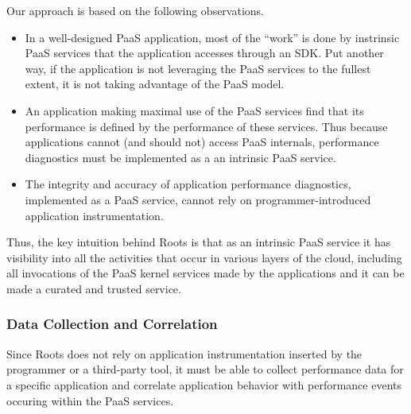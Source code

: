 Our approach is based on the following observations.
\begin{itemize}
\item In a well-designed PaaS application, most of the ``work'' is done by
instrinsic PaaS services that the application accesses through an SDK.  Put
another way, if the application is not leveraging the PaaS services to the
fullest extent, it is not taking advantage of the PaaS model.
\item An application making maximal use of the PaaS services find that its
performance is defined by the performance of these services.  Thus
because applications cannot (and should not) access PaaS 
internals, performance diagnostics must be implemented as a an intrinsic PaaS service.
\item The integrity and accuracy of application performance diagnostics,
implemented as a PaaS service, cannot rely on programmer-introduced
application instrumentation.
\end{itemize}
Thus, the key intuition behind Roots is that as an intrinsic PaaS service
it has visibility into all the activities that occur in various layers of the cloud,
including all invocations of the PaaS kernel services made by the applications
and it can be made a curated and trusted service.

%

\subsubsection{Data Collection and Correlation}

Since Roots does not rely on application instrumentation inserted by the
programmer or a third-party tool, it must be able to collect performance data
for a specific application and correlate application behavior with performance
events occuring within the PaaS services.
 
